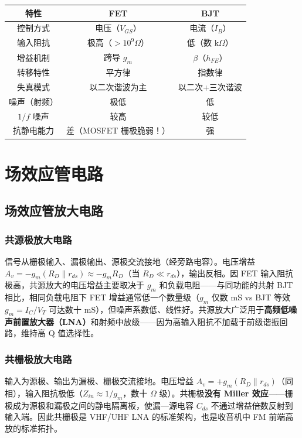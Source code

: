 \documentclass[12pt,UTF8]{ctexbook}
\begin{document}
\begin{center}
\begin{tabular}{c|c|c}
\hline
\textbf{特性} & \textbf{FET} & \textbf{BJT} \\
\hline
控制方式 & 电压（$V_{GS}$） & 电流（$I_B$） \\
输入阻抗 & 极高（$>10^9\Omega$） & 低（数 k$\Omega$） \\
增益机制 & 跨导 $g_m$ & $\beta$（$h_{FE}$） \\
转移特性 & 平方律 & 指数律 \\
失真模式 & 以二次谐波为主 & 以二次+三次谐波 \\
噪声（射频） & 极低 & 低 \\
$1/f$ 噪声 & 较高 & 较低 \\
抗静电能力 & 差（MOSFET 栅极脆弱！） & 强 \\
\hline
\end{tabular}
\end{center}


\chapter{场效应管电路}
\label{chap:fet_circuits}

\section{场效应管放大电路}
\label{sec:fet_amplifier}

\subsection{共源极放大电路}

信号从栅极输入、漏极输出、源极交流接地（经旁路电容）。电压增益 $A_v = -g_m(R_D\parallel r_{ds}) \approx -g_m R_D$（当 $R_D \ll r_{ds}$），输出反相。因 FET 输入阻抗极高，共源放大的电压增益主要取决于 $g_m$ 和负载电阻——与同功能的共射 BJT 相比，相同负载电阻下 FET 增益通常低一个数量级（$g_m$ 仅数 mS vs BJT 等效 $g_m = I_C/V_T$ 可达数十 mS），但噪声系数低、线性好。共源放大广泛用于\textbf{高频低噪声前置放大器（LNA）}和射频中放级——因为高输入阻抗不加载于前级谐振回路，维持高 Q 值选择性。

\subsection{共栅极放大电路}

输入为源极、输出为漏极、栅极交流接地。电压增益 $A_v = +g_m(R_D\parallel r_{ds})$（同相），输入阻抗极低（$Z_{in}\approx 1/g_m$，数十 $\Omega$ 级）。共栅极\textbf{没有 Miller 效应}——栅极成为源极和漏极之间的静电隔离板，使漏—源电容 $C_{ds}$ 不通过增益倍数反射到输入端。因此共栅极是 VHF/UHF LNA 的标准架构，也是收音机中 FM 前端高放的标准拓扑。
\end{document}
